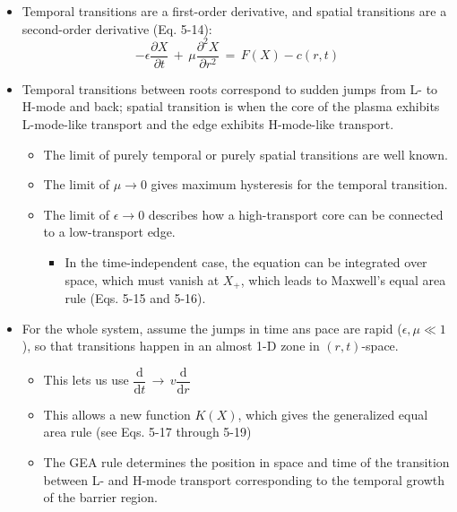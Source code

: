 \documentclass[a4paper]{article}
\begin{document}
\begin{itemize}
\item
  Temporal transitions are a first-order derivative, and spatial
  transitions are a second-order derivative (Eq. 5-14):
  \[-\epsilon\frac{\partial X}{\partial t} \,+\, \mu \frac{\partial^2 X}{\partial r^2} \,=\, F(X) - c(r,t)\]
\item
  Temporal transitions between roots correspond to sudden jumps from L-
  to H-mode and back; spatial transition is when the core of the plasma
  exhibits L-mode-like transport and the edge exhibits H-mode-like
  transport.

  \begin{itemize}
  \item
    The limit of purely temporal or purely spatial transitions are well
    known.
  \item
    The limit of $\mu \rightarrow 0$ gives maximum hysteresis for the
    temporal transition.
  \item
    The limit of $\epsilon \rightarrow 0$ describes how a high-transport
    core can be connected to a low-transport edge.

    \begin{itemize}
    \itemsep1pt\parskip0pt
    \item
      In the time-independent case, the equation can be integrated over
      space, which must vanish at $X_+$, which leads to Maxwell's equal
      area rule (Eqs. 5-15 and 5-16).
    \end{itemize}
  \end{itemize}
\item
  For the whole system, assume the jumps in time ans pace are rapid
  ($\epsilon, \mu \ll 1$), so that transitions happen in an almost 1-D
  zone in $(r,t)$-space.

  \begin{itemize}
  \item
    This lets us use
    $\dfrac{\text{d}}{\text{d}t} \,\rightarrow\, v \dfrac{\text{d}}{\text{d}r}$
  \item
    This allows a new function $K(X)$, which gives the generalized equal
    area rule (see Eqs. 5-17 through 5-19)
  \item
    The GEA rule determines the position in space and time of the
    transition between L- and H-mode transport corresponding to the
    temporal growth of the barrier region.
  \end{itemize}
\end{itemize}
\end{document}

